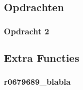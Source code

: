 \documentclass[11pt, a4paper, titlepage, openright]{article}
\begin{document}
	\subsection{Opdrachten}
		\subsubsection{Opdracht 2}
		\bigskip
		
	\subsection{Extra Functies}
		\subsubsection{r0679689\_blabla}
		\bigskip
		
\end{document}
